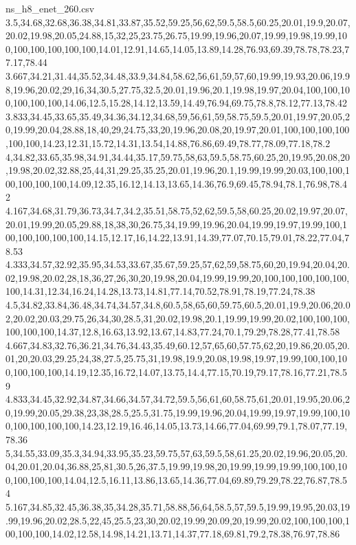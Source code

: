 \begin{filecontents*}[overwrite]{ns_h8_enet_260.csv}
3.5,34.68,32.68,36.38,34.81,33.87,35.52,59.25,56,62,59.5,58.5,60.25,20.01,19.9,20.07,20.02,19.98,20.05,24.88,15,32,25,23.75,26.75,19.99,19.96,20.07,19.99,19.98,19.99,100,100,100,100,100,100,14.01,12.91,14.65,14.05,13.89,14.28,76.93,69.39,78.78,78.23,77.17,78.44
3.667,34.21,31.44,35.52,34.48,33.9,34.84,58.62,56,61,59,57,60,19.99,19.93,20.06,19.98,19.96,20.02,29,16,34,30.5,27.75,32.5,20.01,19.96,20.1,19.98,19.97,20.04,100,100,100,100,100,100,14.06,12.5,15.28,14.12,13.59,14.49,76.94,69.75,78.8,78.12,77.13,78.42
3.833,34.45,33.65,35.49,34.36,34.12,34.68,59,56,61,59,58.75,59.5,20.01,19.97,20.05,20,19.99,20.04,28.88,18,40,29,24.75,33,20,19.96,20.08,20,19.97,20.01,100,100,100,100,100,100,14.23,12.31,15.72,14.31,13.54,14.88,76.86,69.49,78.77,78.09,77.18,78.2
4,34.82,33.65,35.98,34.91,34.44,35.17,59.75,58,63,59.5,58.75,60.25,20,19.95,20.08,20,19.98,20.02,32.88,25,44,31,29.25,35.25,20.01,19.96,20.1,19.99,19.99,20.03,100,100,100,100,100,100,14.09,12.35,16.12,14.13,13.65,14.36,76.9,69.45,78.94,78.1,76.98,78.42
4.167,34.68,31.79,36.73,34.7,34.2,35.51,58.75,52,62,59.5,58,60.25,20.02,19.97,20.07,20.01,19.99,20.05,29.88,18,38,30,26.75,34,19.99,19.96,20.04,19.99,19.97,19.99,100,100,100,100,100,100,14.15,12.17,16,14.22,13.91,14.39,77.07,70.15,79.01,78.22,77.04,78.53
4.333,34.57,32.92,35.95,34.53,33.67,35.67,59.25,57,62,59,58.75,60,20,19.94,20.04,20.02,19.98,20.02,28,18,36,27,26,30,20,19.98,20.04,19.99,19.99,20,100,100,100,100,100,100,14.31,12.34,16.24,14.28,13.73,14.81,77.14,70.52,78.91,78.19,77.24,78.38
4.5,34.82,33.84,36.48,34.74,34.57,34.8,60.5,58,65,60,59.75,60.5,20.01,19.9,20.06,20.02,20.02,20.03,29.75,26,34,30,28.5,31,20.02,19.98,20.1,19.99,19.99,20.02,100,100,100,100,100,100,14.37,12.8,16.63,13.92,13.67,14.83,77.24,70.1,79.29,78.28,77.41,78.58
4.667,34.83,32.76,36.21,34.76,34.43,35.49,60.12,57,65,60,57.75,62,20,19.86,20.05,20.01,20,20.03,29.25,24,38,27.5,25.75,31,19.98,19.9,20.08,19.98,19.97,19.99,100,100,100,100,100,100,14.19,12.35,16.72,14.07,13.75,14.4,77.15,70.19,79.17,78.16,77.21,78.59
4.833,34.45,32.92,34.87,34.66,34.57,34.72,59.5,56,61,60,58.75,61,20.01,19.95,20.06,20,19.99,20.05,29.38,23,38,28.5,25.5,31.75,19.99,19.96,20.04,19.99,19.97,19.99,100,100,100,100,100,100,14.23,12.19,16.46,14.05,13.73,14.66,77.04,69.99,79.1,78.07,77.19,78.36
5,34.55,33.09,35.3,34.94,33.95,35.23,59.75,57,63,59.5,58,61.25,20.02,19.96,20.05,20.04,20.01,20.04,36.88,25,81,30.5,26,37.5,19.99,19.98,20,19.99,19.99,19.99,100,100,100,100,100,100,14.04,12.5,16.11,13.86,13.65,14.36,77.04,69.89,79.29,78.22,76.87,78.54
5.167,34.85,32.45,36.38,35,34.28,35.71,58.88,56,64,58.5,57,59.5,19.99,19.95,20.03,19.99,19.96,20.02,28.5,22,45,25.5,23,30,20.02,19.99,20.09,20,19.99,20.02,100,100,100,100,100,100,14.02,12.58,14.98,14.21,13.71,14.37,77.18,69.81,79.2,78.38,76.97,78.86

\end{filecontents*}

